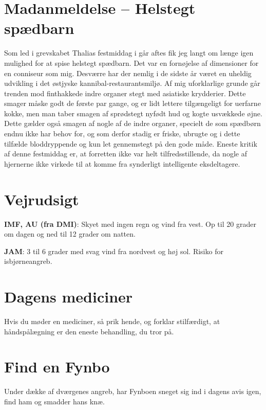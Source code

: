 \begin{minipage}[b]{0.95\linewidth}
\begin{minipage}[t]{0.47\textwidth}
\section*{Madanmeldelse -- Helstegt spædbarn}

\vspace{2mm}
Som led i grevskabet Thalias festmiddag i går aftes fik jeg langt om længe igen mulighed for at spise helstegt spædbarn. Det var en fornøjelse af dimensioner for en conniseur som mig. Desværre har der nemlig i de sidste år været en uheldig udvikling i det østjyske kannibal-restaurantsmiljø. Af mig uforklarlige grunde går trenden mod finthakkede indre organer stegt med asiatiske krydderier. Dette smager måske godt de første par gange, og er lidt lettere tilgængeligt for uerfarne kokke, men man taber smagen af sprødstegt nyfødt hud og kogte usvækkede øjne. Dette gælder også smagen af nogle af de indre organer, specielt de som spædbørn endnu ikke har behov for, og som derfor stadig er friske, ubrugte og i dette tilfælde bloddryppende og kun let gennemstegt på den gode måde. Eneste kritik af denne festmiddag er, at forretten ikke var helt tilfredsstillende, da nogle af hjernerne ikke virkede til at komme fra synderligt intelligente eksdeltagere.

\end{minipage}%
\hfill\begin{minipage}[t]{0.47\textwidth}
\vspace{3mm}
\section*{Vejrudsigt}
\textbf{IMF, AU (fra DMI)}: Skyet med ingen regn og vind fra vest. Op til 20 grader om dagen og ned til 12 grader om natten.

\textbf{JAM}: 3 til 6 grader med svag vind fra nordvest og høj sol. Risiko for isbjørneangreb.

\vspace{-2mm}
\section*{Dagens mediciner}
Hvis du møder en mediciner, så prik hende, og forklar stilfærdigt, at håndspålægning er den eneste behandling, du tror på.

\vspace{-2mm}
\section*{Find en Fynbo}
Under dække af dværgenes angreb, har Fynboen sneget sig ind i dagens avis igen, find ham og smadder hans knæ.


\end{minipage}
\end{minipage}
